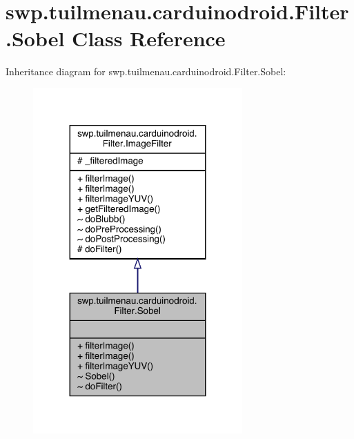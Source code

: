 \hypertarget{classswp_1_1tuilmenau_1_1carduinodroid_1_1_filter_1_1_sobel}{}\section{swp.\+tuilmenau.\+carduinodroid.\+Filter.\+Sobel Class Reference}
\label{classswp_1_1tuilmenau_1_1carduinodroid_1_1_filter_1_1_sobel}


Inheritance diagram for swp.\+tuilmenau.\+carduinodroid.\+Filter.\+Sobel\+:
\nopagebreak
\begin{figure}[H]
\begin{center}
\leavevmode
\includegraphics[width=227pt]{classswp_1_1tuilmenau_1_1carduinodroid_1_1_filter_1_1_sobel__inherit__graph}
\end{center}
\end{figure}


